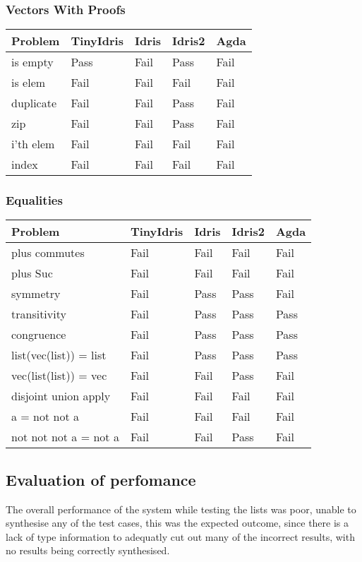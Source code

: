 \documentclass[a4paper]{article}
\begin{document}
\subsubsection{Vectors With Proofs}
\label{sec:orge605b92}
\begin{center}
\begin{tabular}{lllll}
Problem & TinyIdris & Idris & Idris2 & Agda\\
\hline
is empty & Pass & Fail & Pass & Fail\\
is elem & Fail & Fail & Fail & Fail\\
duplicate & Fail & Fail & Pass & Fail\\
zip & Fail & Fail & Pass & Fail\\
i'th elem & Fail & Fail & Fail & Fail\\
index & Fail & Fail & Fail & Fail\\
\end{tabular}
\end{center}

\subsubsection{Equalities}
\label{sec:org3daf245}

\begin{center}
\begin{tabular}{lllll}
Problem & TinyIdris & Idris & Idris2 & Agda\\
\hline
plus commutes & Fail & Fail & Fail & Fail\\
plus Suc & Fail & Fail & Fail & Fail\\
symmetry & Fail & Pass & Pass & Fail\\
transitivity & Fail & Pass & Pass & Pass\\
congruence & Fail & Pass & Pass & Pass\\
list(vec(list)) = list & Fail & Pass & Pass & Pass\\
vec(list(list)) = vec & Fail & Fail & Pass & Fail\\
disjoint union apply & Fail & Fail & Fail & Fail\\
a = not not a & Fail & Fail & Fail & Fail\\
not not not a = not a & Fail & Fail & Pass & Fail\\
\end{tabular}
\end{center}

\subsection{Evaluation of perfomance}
\label{sec:org4c9aa94}
The overall performance of the system while testing 
the lists was poor, unable to synthesise any of the 
test cases, this was the expected outcome, since
there is a lack of type information to adequatly cut out 
many of the incorrect results, with no results being correctly 
synthesised. 
\end{document}
